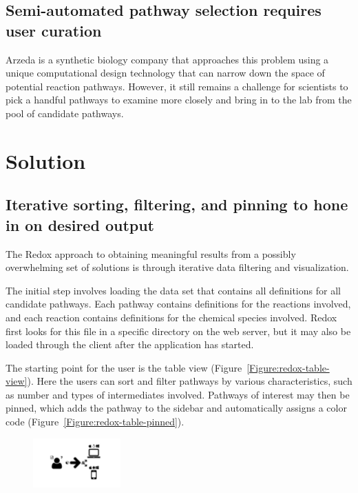 \subsection{Semi-automated pathway selection requires user curation}
Arzeda is a synthetic biology company that approaches this problem using a unique computational design technology that can narrow down the space of potential reaction pathways.
However, it still remains a challenge for scientists to pick a handful pathways to examine more closely and bring in to the lab from the pool of candidate pathways.


\section{Solution}

\subsection{Iterative sorting, filtering, and pinning to hone in on desired output}

The Redox approach to obtaining meaningful results from a possibly overwhelming set of solutions is through iterative data filtering and visualization.

The initial step involves loading the data set that contains all definitions for all candidate pathways.
Each pathway contains definitions for the reactions involved, and each reaction contains definitions for the chemical species involved.
Redox first looks for this file in a specific directory on the web server, but it may also be loaded through the client after the application has started.

The starting point for the user is the table view (Figure~\ref{Figure:redox-table-view}).
Here the users can sort and filter pathways by various characteristics, such as number and types of intermediates involved.
Pathways of interest may then be pinned, which adds the pathway to the sidebar and automatically assigns a color code (Figure~\ref{Figure:redox-table-pinned}).

\begin{figure}
  \includegraphics[width=0.3\textwidth, page=29,trim=0cm 0cm 18.3cm 0cm, clip=true]{images/Figures.pdf}
  \caption{}
  \label{Figure:redox-flow}
\end{figure}
